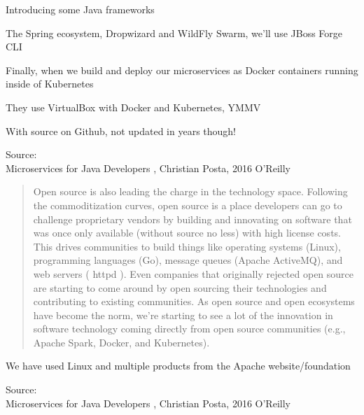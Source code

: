 \documentclass[Screen16to9,17pt]{foils}
\begin{document}
Introducing some Java frameworks
\begin{list2}
\item The Spring ecosystem, Dropwizard and WildFly Swarm, we’ll use JBoss Forge CLI
\item Finally, when we build and deploy our microservices as Docker containers running inside of Kubernetes
\item They use VirtualBox with Docker and Kubernetes, YMMV
\item With source on Github, not updated in years though!\\
\end{list2}
Source: {\footnotesize\\
Microservices for Java Developers , Christian Posta, 2016 O’Reilly}




\begin{quote}\small
Open source is also leading the charge in the technology space. Following the commoditization curves, open source is a place developers can go to challenge proprietary vendors by building and
  innovating on software that was once only available (without source
  no less) with high license costs. This drives communities to build
  things like operating systems (Linux), programming languages (Go),
  message queues (Apache ActiveMQ), and web servers ( httpd ). Even
  companies that originally rejected open source are starting to come
  around by open sourcing their technologies and contributing to
  existing communities. As open source and open ecosystems have
  become the norm, we’re starting to see a lot of the innovation in
  software technology coming directly from open source communities
  (e.g., Apache Spark, Docker, and Kubernetes).
\end{quote}

\begin{list2}
\item We have used Linux and multiple products from the Apache website/foundation
\end{list2}
Source: {\footnotesize\\
Microservices for Java Developers , Christian Posta, 2016 O’Reilly}





\end{document}
